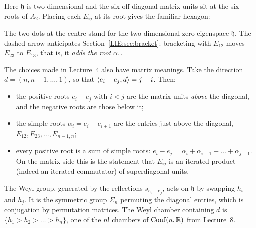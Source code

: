 \begin{example}[$\mathfrak{sl}_3$]\label{LIE:ex:sl3}
Here $\mathfrak h$ is two-dimensional and the six off-diagonal matrix units sit at the six roots of
$A_2$. Placing each $E_{ij}$ at its root gives the familiar hexagon:
\begin{center}
\end{center}
The two dots at the centre stand for the two-dimensional zero eigenspace $\mathfrak h$. The dashed
arrow anticipates Section~\ref{LIE:sec:bracket}: bracketing with $E_{12}$ moves $E_{23}$ to $E_{13}$,
that is, it \emph{adds the root} $\alpha_1$.
\end{example}

The choices made in Lecture~4 also have matrix meanings. Take the direction $d=(n,n-1,\dots,1)$, so
that $\langle e_i-e_j, d\rangle=j-i$. Then:
\begin{itemize}
\item the positive roots $e_i-e_j$ with $i<j$ are the matrix units \emph{above} the diagonal, and
  the negative roots are those below it;
\item the simple roots $\alpha_i=e_i-e_{i+1}$ are the entries just above the diagonal,
  $E_{12},E_{23},\dots,E_{n-1,n}$;
\item every positive root is a sum of simple roots: $e_i-e_j=\alpha_i+\alpha_{i+1}+\dots+\alpha_{j-1}$.
  On the matrix side this is the statement that $E_{ij}$ is an iterated product (indeed an iterated
  commutator) of superdiagonal units.
\end{itemize}
The Weyl group, generated by the reflections $s_{e_i-e_j}$, acts on $\mathfrak h$ by swapping $h_i$ and
$h_j$. It is the symmetric group $\Sigma_n$ permuting the diagonal entries, which is conjugation by
permutation matrices. The Weyl chamber containing $d$ is $\{h_1>h_2>\dots>h_n\}$, one of the $n!$
chambers of $\operatorname{Conf}(n,\mathbb{R})$ from Lecture~8.

